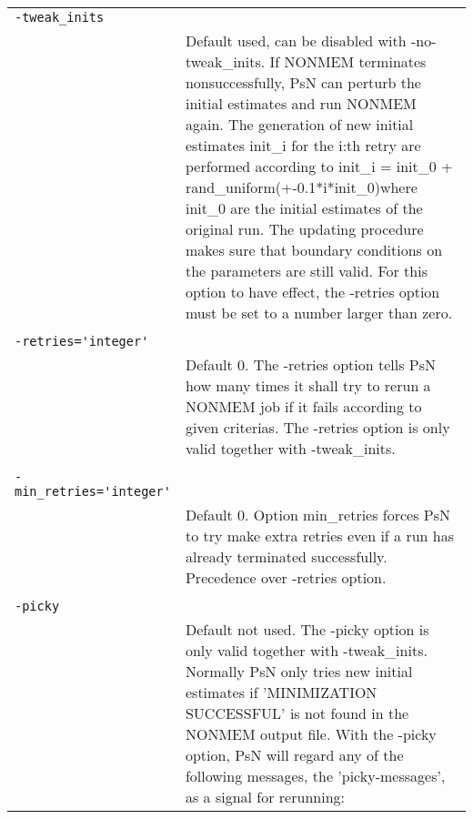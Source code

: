 \documentclass[a4paper,12pt]{article}
\begin{document}
\begin{longtable}{p{1in}p{4in}}
\verb|-tweak_inits| & \\
\nopagebreak
 & Default used, can be disabled with -no-tweak\_inits. If NONMEM terminates nonsuccessfully, PsN can perturb the initial estimates and run NONMEM again. The generation of new initial estimates init\_i for the i:th retry are performed according to init\_i = init\_0 + rand\_uniform(+-0.1*i*init\_0)where init\_0 are the initial estimates of the original run. The updating procedure makes sure that boundary conditions on the parameters are still valid. For this option to have effect, the -retries option must be set to a number larger than zero. \\
\\
\verb|-retries='integer'| & \\
\nopagebreak
 & Default 0. The -retries option tells PsN how many times it shall try to rerun a NONMEM job if it fails according to given criterias. The -retries option is only valid together with -tweak\_inits. \\
\\
\verb|-min_retries='integer'| & \\
\nopagebreak
 & Default 0. Option min\_retries forces PsN to try make extra retries even if a run has already terminated successfully. Precedence over -retries option.  \\
\\
\verb|-picky| & \\
\nopagebreak
 & Default not used. The -picky option is only valid together with -tweak\_inits. Normally PsN only tries new initial estimates if 'MINIMIZATION SUCCESSFUL' is not found in the NONMEM output file. With the -picky option, PsN will regard any of the following messages, the 'picky-messages',  as a signal for rerunning:


\end{longtable}
\end{document}
